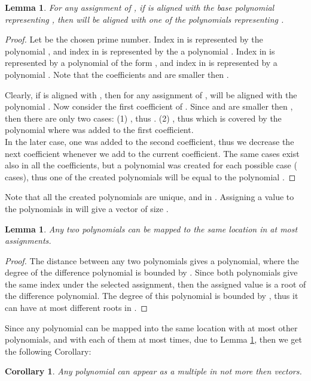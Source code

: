 \documentclass[11pt,amssymb]{article}
\newtheorem{lemma}[theorem]{Lemma}
\newtheorem{corollary}{Corollary}
\begin{document}
\begin{lemma}\label{l:PolAllignment}
For any assignment of , if  is aligned with the base
polynomial representing , then  will be aligned with
one of the polynomials representing .
\end{lemma}
\begin{proof}
Let  be the chosen prime number. Index  in  is
represented by the polynomial , and index  in  is
represented by the a polynomial .
Index  in  is represented by a polynomial of the form
, and index  in  is
represented by a polynomial . Note
that the coefficients  and  are smaller then .

Clearly, if  is aligned with , then for any
assignment of ,  will be aligned with the polynomial
. Now consider
the first coefficient of . Since  and  are
smaller then , then there are only two cases: (1)
, thus . (2)
, thus 
which is covered by the
polynomial where  was added to the first coefficient.\\
In the later case, one was added to the second coefficient, thus we
decrease the next coefficient whenever we add  to the
current coefficient. The same cases exist also in all the
coefficients, but a polynomial was created for each possible case (
cases), thus one of the created polynomials will be equal to the
polynomial . 
\end{proof}

Note that all the  created polynomials are unique, and
in . Assigning a value to the polynomials in  will give a
vector of size .

\begin{lemma}\label{l:maxRoots}
Any two polynomials can be mapped to the same location in at most
 assignments.
\end{lemma}
\begin{proof}
The distance between any two polynomials gives a polynomial, where the
degree of the difference polynomial is bounded by . Since both
polynomials give the same index under the selected assignment, then the
assigned value is a root of the difference polynomial. The degree of
this polynomial is bounded by , thus it can have at most 
different roots in . 
\end{proof}

Since any polynomial can be mapped into the same location with at most
 other polynomials, and with each of them at most 
times, due to Lemma \ref{l:maxRoots}, then we get the following
Corollary:
\begin{corollary}\label{c:maxPolMultiples}
Any polynomial can appear as a {\it multiple} in not more then  vectors.
\end{corollary}
\end{document}
